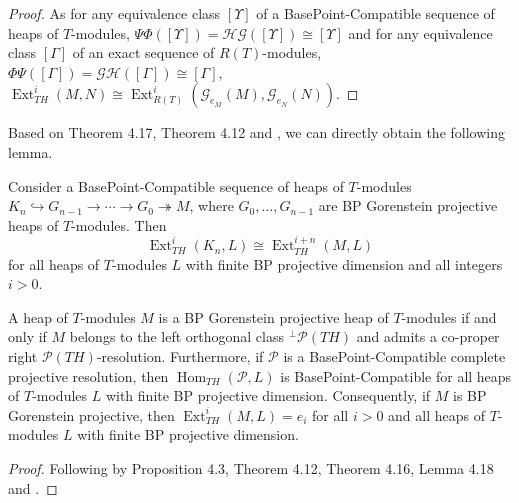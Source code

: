 \documentclass[11pt, twoside]{article}
\begin{document}
\begin{proof}
As for any equivalence class $[\Upsilon]$ of a BasePoint-Compatible sequence of heaps of $T$-modules, $\Psi\Phi([\Upsilon])=\mathcal{H}\mathcal{G}([\Upsilon])\cong[\Upsilon]$ and for any equivalence class $[\Gamma]$ of an exact sequence of $R(T)$-modules, $\Phi\Psi([\Gamma])=\mathcal{G}\mathcal{H}([\Gamma])\cong [\Gamma]$, $\operatorname{Ext}_{TH}^i(M,N)\cong \operatorname{Ext}_{R(T)}^i(\mathcal{G}_{e_M}(M),\mathcal{G}_{e_N}(N))$.
\end{proof}
Based on Theorem 4.17, Theorem 4.12 and \cite[Lemma 2.17]{rb}, we can directly obtain the following lemma.

\begin{lemma}
Consider a BasePoint-Compatible sequence of heaps of $T$-modules $K_n\hookrightarrow G_{n-1}\rightarrow \cdots \rightarrow G_0 \twoheadrightarrow M$, where $G_0,\ldots,G_{n-1}$ are BP Gorenstein projective heaps of $T$-modules. Then
$$\operatorname{Ext}_{TH}^i(K_n,L)\cong \operatorname{Ext}_{TH}^{i+n}(M,L)$$
for all heaps of $T$-modules $L$ with finite BP projective dimension and all integers $i>0$.
\end{lemma}

\begin{lemma}
A heap of $T$-modules $M$ is a BP Gorenstein projective heap of $T$-modules if and only if $M$ belongs to the left orthogonal class $^{\bot}\mathcal{P}(TH)$ and admits a co-proper right $\mathcal{P}(TH)$-resolution. Furthermore, if $\mathcal{P}$ is a BasePoint-Compatible complete projective resolution, then $\operatorname{Hom}_{TH}(\mathcal{P}, L)$ is BasePoint-Compatible for all heaps of $T$-modules $L$ with finite BP projective dimension. Consequently, if $M$ is BP Gorenstein projective, then $\operatorname{Ext}_{TH}^{i}(M, L)=e_i$ for all $i>0$ and all heaps of $T$-modules $L$ with finite BP projective dimension.
\end{lemma}
\begin{proof}
Following by Proposition 4.3, Theorem 4.12, Theorem 4.16, Lemma 4.18 and \cite[Proposition 2.3]{rb}.
\end{proof}
\end{document}
